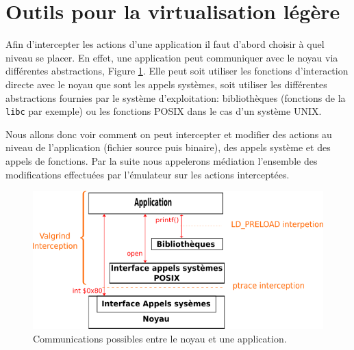 \section{Outils pour la virtualisation légère}
\label{section:tools}

Afin d'intercepter les actions d'une application il faut d'abord choisir à quel
niveau se placer.  En effet, une application peut communiquer avec le noyau via
différentes abstractions, Figure \ref{AS_Communication}. Elle peut soit utiliser
les fonctions d'interaction directe avec le noyau que sont les appels systèmes,
soit utiliser les différentes abstractions fournies par le système
d'exploitation: bibliothèques (fonctions de la \texttt{libc} par exemple) ou les
fonctions POSIX dans le cas d'un système UNIX.

Nous allons donc voir comment on peut intercepter et modifier des actions au
niveau de l'application (fichier source puis binaire), des appels système et
des appels de fonctions. Par la suite nous appelerons médiation l'ensemble des
modifications effectuées par l'émulateur sur les actions interceptées.

\begin{figure}[H]
 \centering
 \includegraphics[scale=0.75]{Pictures/png/Communication_application_noyau_v3.png}
 \caption{Communications possibles entre le noyau et une application.}
 \label{AS_Communication}
\end{figure}
